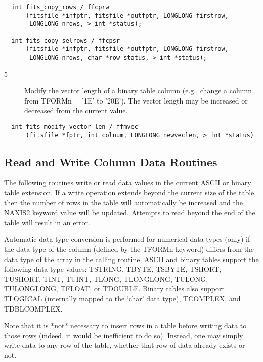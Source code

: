 \documentclass[11pt]{book}
\begin{document}
\begin{verbatim}
  int fits_copy_rows / ffcprw
      (fitsfile *infptr, fitsfile *outfptr, LONGLONG firstrow,
       LONGLONG nrows, > int *status);

  int fits_copy_selrows / ffcpsr
      (fitsfile *infptr, fitsfile *outfptr, LONGLONG firstrow,
       LONGLONG nrows, char *row_status, > int *status);
\end{verbatim}

\begin{description}
\item[5 ] Modify the vector length of a binary table column (e.g.,
    change a column from TFORMn = '1E' to '20E').  The vector
   length may be increased or decreased from the current value. \label{ffmvec}
\end{description}

\begin{verbatim}
  int fits_modify_vector_len / ffmvec
      (fitsfile *fptr, int colnum, LONGLONG newveclen, > int *status)
\end{verbatim}

\subsection{Read and Write Column Data Routines}

The following routines write or read data values in the current ASCII
or binary table extension.  If a write operation extends beyond the
current size of the table, then the number of rows in the table will
automatically be increased and the NAXIS2 keyword value will be
updated.  Attempts to read beyond the end of the table will result in
an error.

Automatic data type conversion is performed for numerical data types
(only) if the data type of the column (defined by the TFORMn keyword)
differs from the data type of the array in the calling routine.  ASCII and binary
tables support the following data type values:  TSTRING, TBYTE, TSBYTE, TSHORT,
TUSHORT, TINT, TUINT, TLONG, TLONGLONG, TULONG, TULONGLONG, TFLOAT, or TDOUBLE.
Binary tables also support TLOGICAL (internally mapped to the `char'
data type), TCOMPLEX, and TDBLCOMPLEX.

Note that it is *not* necessary to insert rows in a table before
writing data to those rows (indeed, it would be inefficient to do so).
Instead, one may simply write data to any row of the table, whether that
row of data already exists or not.
\end{document}
